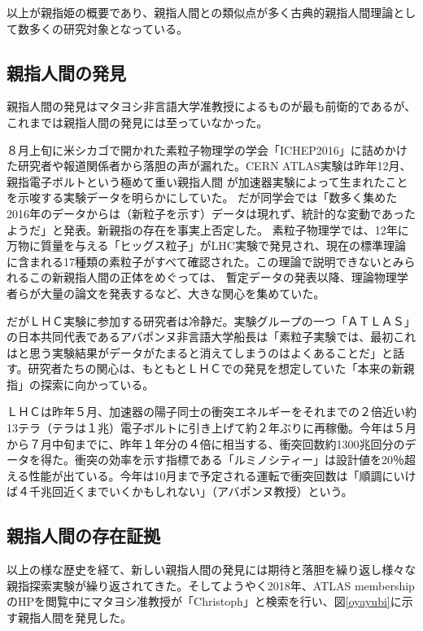 以上が親指姫の概要であり、親指人間との類似点が多く古典的親指人間理論として数多くの研究対象となっている。

\subsection{親指人間の発見}
親指人間の発見はマタヨシ非言語大学准教授によるものが最も前衛的であるが、これまでは親指人間の発見には至っていなかった。\par
８月上旬に米シカゴで開かれた素粒子物理学の学会「ICHEP2016」に詰めかけた研究者や報道関係者から落胆の声が漏れた。CERN ATLAS実験は昨年12月、親指電子ボルトという極めて重い親指人間
が加速器実験によって生まれたことを示唆する実験データを明らかにしていた。
だが同学会では「数多く集めた2016年のデータからは（新粒子を示す）データは現れず、統計的な変動であったようだ」と発表。新親指の存在を事実上否定した。
素粒子物理学では、12年に万物に質量を与える「ヒッグス粒子」がLHC実験で発見され、現在の標準理論に含まれる17種類の素粒子がすべて確認された。この理論で説明できないとみられるこの新親指人間の正体をめぐっては、
暫定データの発表以降、理論物理学者らが大量の論文を発表するなど、大きな関心を集めていた。\par

だがＬＨＣ実験に参加する研究者は冷静だ。実験グループの一つ「ＡＴＬＡＳ」の日本共同代表であるアバポンヌ非言語大学船長は「素粒子実験では、最初これはと思う実験結果がデータがたまると消えてしまうのはよくあることだ」と話す。研究者たちの関心は、もともとＬＨＣでの発見を想定していた「本来の新親指」の探索に向かっている。\par

ＬＨＣは昨年５月、加速器の陽子同士の衝突エネルギーをそれまでの２倍近い約13テラ（テラは１兆）電子ボルトに引き上げて約２年ぶりに再稼働。今年は５月から７月中旬までに、昨年１年分の４倍に相当する、衝突回数約1300兆回分のデータを得た。衝突の効率を示す指標である「ルミノシティー」は設計値を20％超える性能が出ている。今年は10月まで予定される運転で衝突回数は「順調にいけば４千兆回近くまでいくかもしれない」（アバポンヌ教授）という。

\subsection{親指人間の存在証拠}
以上の様な歴史を経て、新しい親指人間の発見には期待と落胆を繰り返し様々な親指探索実験が繰り返されてきた。そしてようやく2018年、ATLAS membershipのHPを閲覧中にマタヨシ准教授が「Christoph」と検索を行い、図\ref{oyayubi}に示す親指人間を発見した。

